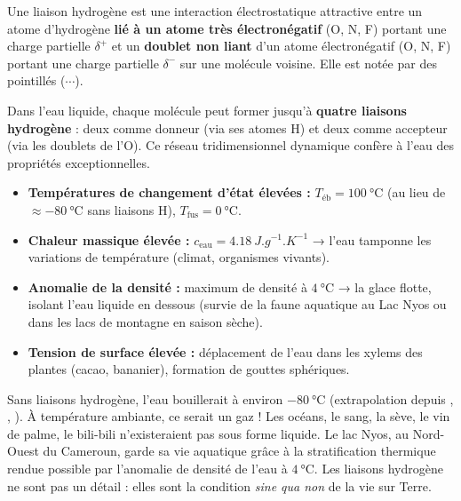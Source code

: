 \documentclass[11pt]{article}
\begin{document}
\begin{definition}
Une liaison hydrogène est une interaction électrostatique attractive entre un atome d'hydrogène \textbf{lié à un atome très électronégatif} (O, N, F) portant une charge partielle $\delta^+$ et un \textbf{doublet non liant} d'un atome électronégatif (O, N, F) portant une charge partielle $\delta^-$ sur une molécule voisine. Elle est notée par des pointillés ($\cdots$).
\end{definition}

Dans l'eau liquide, chaque molécule  peut former jusqu'à \textbf{quatre liaisons hydrogène} : deux comme donneur (via ses atomes H) et deux comme accepteur (via les doublets de l'O). Ce réseau tridimensionnel dynamique confère à l'eau des propriétés exceptionnelles.

\begin{propriete}
\begin{itemize}
    \item \textbf{Températures de changement d'état élevées :} $T_{\text{éb}} = \SI{100}{\celsius}$ (au lieu de $\approx -\SI{80}{\celsius}$ sans liaisons H), $T_{\text{fus}} = \SI{0}{\celsius}$.
    \item \textbf{Chaleur massique élevée :} $c_{\text{eau}} = \SI{4,18}{J.g^{-1}.K^{-1}}$ → l'eau tamponne les variations de température (climat, organismes vivants).
    \item \textbf{Anomalie de la densité :} maximum de densité à $\SI{4}{\celsius}$ → la glace flotte, isolant l'eau liquide en dessous (survie de la faune aquatique au Lac Nyos ou dans les lacs de montagne en saison sèche).
    \item \textbf{Tension de surface élevée :} déplacement de l'eau dans les xylems des plantes (cacao, bananier), formation de gouttes sphériques.
\end{itemize}
\end{propriete}

\begin{savaistu}
Sans liaisons hydrogène, l'eau bouillerait à environ $-\SI{80}{\celsius}$ (extrapolation depuis , , ). À température ambiante, ce serait un gaz ! Les océans, le sang, la sève, le vin de palme, le bili-bili n'existeraient pas sous forme liquide. Le lac Nyos, au Nord-Ouest du Cameroun, garde sa vie aquatique grâce à la stratification thermique rendue possible par l'anomalie de densité de l'eau à $\SI{4}{\celsius}$. Les liaisons hydrogène ne sont pas un détail : elles sont la condition \emph{sine qua non} de la vie sur Terre.
\end{savaistu}
\end{document}
